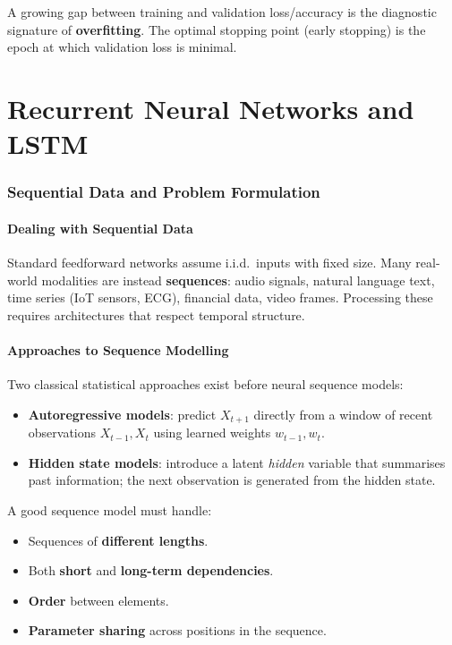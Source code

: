 \documentclass[11pt,a4paper]{article}
\theoremstyle{definition}
\theoremstyle{plain}
\theoremstyle{remark}
\begin{document}
A growing gap between training and validation loss/accuracy is the diagnostic signature of \textbf{overfitting}.
The optimal stopping point (early stopping) is the epoch at which validation loss is minimal.


\part{Recurrent Neural Networks and LSTM}

\section{Sequential Data and Problem Formulation}

\subsection{Dealing with Sequential Data}

Standard feedforward networks assume i.i.d.\ inputs with fixed size. Many real-world modalities are instead \textbf{sequences}: audio signals, natural language text, time series (IoT sensors, ECG), financial data, video frames. Processing these requires architectures that respect temporal structure.

\subsection{Approaches to Sequence Modelling}

Two classical statistical approaches exist before neural sequence models:

\begin{itemize}
    \item \textbf{Autoregressive models}: predict $X_{t+1}$ directly from a window of recent observations $X_{t-1}, X_t$ using learned weights $w_{t-1}, w_t$.
    \item \textbf{Hidden state models}: introduce a latent \textit{hidden} variable that summarises past information; the next observation is generated from the hidden state.
\end{itemize}

A good sequence model must handle:
\begin{itemize}
    \item Sequences of \textbf{different lengths}.
    \item Both \textbf{short} and \textbf{long-term dependencies}.
    \item \textbf{Order} between elements.
    \item \textbf{Parameter sharing} across positions in the sequence.
\end{itemize}
\end{document}
